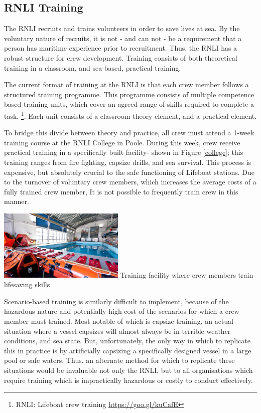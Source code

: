 \documentclass[a4paper, openright, twoside]{report}
\begin{document}
\subsection{RNLI Training} \label{rnli_training}
The RNLI recruits and trains volunteers in order to save lives at sea. By the voluntary nature of recruits, it is not - and can not - be a requirement that a person has maritime experience prior to recruitment. Thus, the RNLI has a robust structure for crew development. Training consists of both theoretical training in a classroom, and sea-based, practical training.

The current format of training at the RNLI is that each crew member follows a structured training programme. This programme consists of multiple competence based training units, which cover an agreed range of skills required to complete a task. \footnote{RNLI: Lifeboat crew training \url{https://goo.gl/kuCafE}}. Each unit consists of a classroom theory element, and a practical element. 

To bridge this divide between theory and practice, all crew must attend a 1-week training course at the RNLI College in Poole. During this week, crew receive practical training in a specifically built facility- shown in Figure \ref{college}; this training ranges from fire fighting, capsize drills, and sea survival. This process is expensive, but absolutely crucial to the safe functioning of Lifeboat stations. Due to the turnover of voluntary crew members, which increases the average costs of a fully trained crew member, It is not possible to frequently train crew in this manner. 

\begin{center}
\includegraphics[width=0.45\textwidth]{images/rnli_college.jpg}
 {Training facility where crew members train lifesaving skills}
\label{college}
\hfill \break
\end{center}


Scenario-based training is similarly difficult to implement, because of the hazardous nature and potentially high cost of the scenarios for which a crew member must trained. Most notable of which is capsize training, an actual situation where a vessel capsizes will almost always be in terrible weather conditions, and sea state. But, unfortunately, the only way in which to replicate this in practice is by artificially capsizing a specifically designed vessel in a large pool or safe waters. Thus, an alternate method for which to replicate these situations would be invaluable not only the RNLI, but to all organisations which require training which is impractically hazardous or costly to conduct effectively. 
\end{document}
